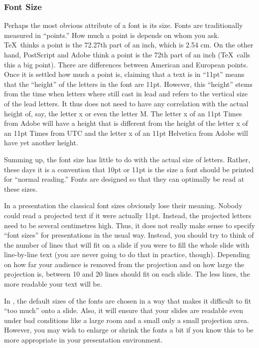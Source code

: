 \subsubsection{Font Size}
\label{section-sizes}

Perhaps the most obvious attribute of a font is its size. Fonts are traditionally measured in ``points.'' How much a point is depends on whom you ask. \TeX\ thinks a point is the 72.27th part of an inch, which is 2.54 cm. On the other hand, PostScript and Adobe think a point is the 72th part of an inch (\TeX\ calls this a big point). There are differences between American and European points. Once it is settled how much a point is, claiming that a text is in ``11pt'' means that the ``height'' of the letters in the font are 11pt. However, this ``height'' stems from the time when letters where still cast in lead and refers to the vertical size of the lead letters. It thus does not need to have any correlation with the actual height of, say, the letter x or even the letter M. The letter x of an 11pt Times from Adobe will have a height that is different from the height of the letter x of an 11pt Times from UTC and the letter x of an 11pt Helvetica from Adobe will have yet another height.

Summing up, the font size has little to do with the actual size of letters. Rather, these days it is a convention that 10pt or 11pt is the size a font should be printed for ``normal reading.'' Fonts are designed so that they can optimally be read at these sizes.

In a presentation the classical font sizes obviously lose their meaning. Nobody could read a projected text if it were actually 11pt. Instead, the projected letters need to be several centimetres high. Thus, it does not really make sense to specify ``font sizes'' for presentations in the usual way. Instead, you should try to think of the number of lines that will fit on a slide if you were to fill the whole slide with line-by-line text (you are never going to do that in practice, though). Depending on how far your audience is removed from the projection and on how large the projection is, between 10 and 20 lines should fit on each slide. The less lines, the more readable your text will be.

In \beamer, the default sizes of the fonts are chosen in a way that makes it difficult to fit ``too much'' onto a slide. Also, it will ensure that your slides are readable even under bad conditions like a large room and a small only a small projection area. However, you may wish to enlarge or shrink the fonts a bit if you know this to be more appropriate in your presentation environment.

